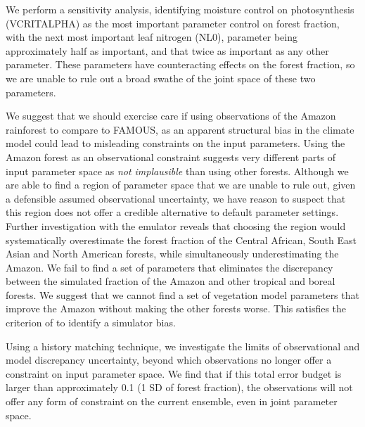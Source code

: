 \documentclass[esd, manuscript]{copernicus}
\begin{document}
We perform a sensitivity analysis, identifying moisture control on photosynthesis (VCRITALPHA) as the most important parameter control on forest fraction, with the next most important leaf nitrogen (NL0), parameter being approximately half as important, and that twice as important as any other parameter. These parameters have counteracting effects on the forest fraction, so we are unable to rule out a broad swathe of the joint space of these two parameters.

We suggest that we should exercise care if using observations of the Amazon rainforest to compare to FAMOUS, as an apparent structural bias in the climate model could lead to misleading constraints on the input parameters. Using the Amazon forest as an observational constraint suggests very different parts of input parameter space as \emph{not implausible} than using other forests. Although we are able to find a region of parameter space that we are unable to rule out, given a defensible assumed observational uncertainty, we have reason to suspect that this region does not offer a credible alternative to default parameter settings. Further investigation with the emulator reveals that choosing the region would systematically overestimate the forest fraction of the Central African, South East Asian and North American forests, while simultaneously underestimating the Amazon.  We fail to find a set of parameters that eliminates the discrepancy between the simulated fraction of the Amazon and other tropical and boreal forests. We suggest that we cannot find a set of vegetation model parameters that improve the Amazon without making the other forests worse. This satisfies the criterion of \citep{williamson2014identifying} to identify a simulator bias. 

Using a history matching technique, we investigate the limits of observational and model discrepancy uncertainty, beyond which observations no longer offer a constraint on input parameter space. We find that if this total error budget is larger than approximately 0.1 (1 SD of forest fraction), the observations will not offer any form of constraint on the current ensemble, even in joint parameter space.
\end{document}
